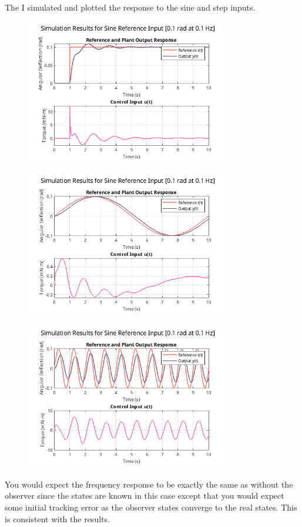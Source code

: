 \documentclass{article}
\begin{document}
The I simulated and plotted the response to the sine and step inputs.

\begin{figure}[H]
\centering
\includegraphics[width=0.8\textwidth]{obsStepResp.png}
\label{fig:obsStepResp}
\end{figure}

\begin{figure}[H]   
\centering
\includegraphics[width=0.8\textwidth]{obsSinRespPointOne.png}
\label{fig:obsSinRespPointOne}
\end{figure}

\begin{figure}[H]
\centering
\includegraphics[width=0.8\textwidth]{obsSinRespOne.png}
\label{fig:obsSinRespOne}
\end{figure}        

You would expect the frequency response to be exactly the same as without the observer since the states are known in this case except that you would expect some initial tracking error as the observer states converge to the real states.
This is consistent with the results.
\end{document}
